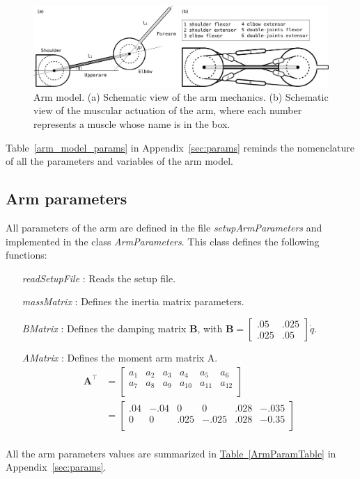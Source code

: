 \documentclass[pdftex,a4paper,11pt]{report}
\begin{document}
\begin{figure}[hbt]
\centering
	\includegraphics[width=0.9\columnwidth]{figures/arm_model_horiz.pdf}
	\caption{Arm model. (a) Schematic view of the arm mechanics. (b) Schematic view of the muscular actuation of the arm, where each number represents a muscle whose name is in the box.}
	\label{fig:arm_model}
\end{figure}

Table~\ref{arm_model_params} in Appendix~\ref{sec:params} reminds the nomenclature of all the parameters and variables of the arm model. 

\subsection{Arm parameters}
\label{sec:arm_parameters}
All parameters of the arm are defined in the file \textit{setupArmParameters} and implemented in the class \textit{ArmParameters}.
This class defines the following functions:
\begin{itemize}
\item[\textit{readSetupFile}]: Reads the setup file.
\item[\textit{massMatrix}]: Defines the inertia matrix parameters.
\item[\textit{BMatrix}]: Defines the damping matrix \textbf{B}, with
$\textbf{B} = \begin{bmatrix}
           .05 & .025 \\
          .025 & .05
     \end{bmatrix} \dot{q}.$\\
\item[\textit{AMatrix}]: Defines the moment arm matrix A.
\begin{align*}
  \textbf{A}^\top        & = \begin{bmatrix}
    a_{1} & a_{2} & a_{3} & a_{4} & a_{5} & a_{6} \\
    a_{7} & a_{8} & a_{9} & a_{10} & a_{11} & a_{12} \\
  \end{bmatrix} \\
  & = \begin{bmatrix}
    .04 & -.04 &    0 &     0 & .028 & -.035 \\
    0 &    0 & .025 & -.025 & .028 & -0.35 \\
  \end{bmatrix}\\
\end{align*}
\end{itemize}
All the arm parameters values are summarized in \hyperref[ArmParamTable]{Table~\ref{ArmParamTable}} in Appendix~\ref{sec:params}.
\end{document}
